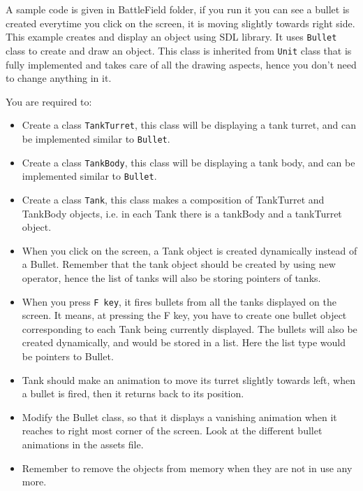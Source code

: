 \documentclass[a4paper,12pt]{article}
\begin{document}
A sample code is given in BattleField folder, if you run it you can see a bullet is created everytime you click on the screen, it is moving slightly towards right side. This example creates and display an object using SDL library. It uses \texttt{Bullet} class to create and draw an object. This class is inherited from \texttt{Unit} class that is fully implemented and takes care of all the drawing aspects, hence you don't need to change anything in it.

You are required to:
\begin{itemize}
	\item Create a class \texttt{TankTurret}, this class will be displaying a tank turret, and can be implemented similar to \texttt{Bullet}.
	\item Create a class \texttt{TankBody}, this class will be displaying a tank body, and can be implemented similar to \texttt{Bullet}.
	\item Create a class \texttt{Tank}, this class makes a composition of TankTurret and TankBody objects, i.e. in each Tank there is a tankBody and a tankTurret object.
	\item When you click on the screen, a Tank object is created dynamically instead of a Bullet. Remember that the tank object should be created by using new operator, hence the list of tanks will also be storing pointers of tanks.
	\item When you press \texttt{F key}, it fires bullets from all the tanks displayed on the screen. It means, at pressing the F key, you have to create one bullet object corresponding to each Tank being currently displayed. The bullets will also be created dynamically, and would be stored in a list. Here the list type would be pointers to Bullet.
	\item Tank should make an animation to move its turret slightly towards left, when a bullet is fired, then it returns back to its position.
	\item Modify the Bullet class, so that it displays a vanishing animation when it reaches to right most corner of the screen. Look at the different bullet animations in the assets file.
	      
	\item Remember to remove the objects from memory when they are not in use any more.
\end{itemize}
\end{document}
